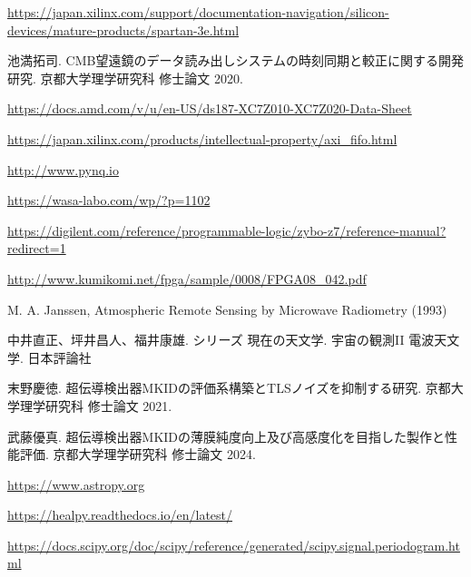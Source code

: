 \begin{thebibliography}{99}
\href{https://japan.xilinx.com/support/documentation-navigation/silicon-devices/mature-products/spartan-3e.html}{
https://japan.xilinx.com/support/documentation-navigation/silicon-devices/mature-products/spartan-3e.html}

池満拓司. CMB望遠鏡のデータ読み出しシステムの時刻同期と較正に関する開発研究. 京都大学理学研究科 修士論文 2020.

\href{https://docs.amd.com/v/u/en-US/ds187-XC7Z010-XC7Z020-Data-Sheet}{https://docs.amd.com/v/u/en-US/ds187-XC7Z010-XC7Z020-Data-Sheet}

\href{https://japan.xilinx.com/products/intellectual-property/axi\_fifo.html}{https://japan.xilinx.com/products/intellectual-property/axi\_fifo.html}

\href{http://www.pynq.io}{http://www.pynq.io}

\href{https://wasa-labo.com/wp/?p=1102}{https://wasa-labo.com/wp/?p=1102}

\href{https://digilent.com/reference/programmable-logic/zybo-z7/reference-manual?redirect=1}{https://digilent.com/reference/programmable-logic/zybo-z7/reference-manual?redirect=1}


\href{http://www.kumikomi.net/fpga/sample/0008/FPGA08\_042.pdf}{http://www.kumikomi.net/fpga/sample/0008/FPGA08\_042.pdf}


M. A. Janssen, Atmospheric Remote Sensing by Microwave Radiometry (1993)

中井直正、坪井昌人、福井康雄. シリーズ  現在の天文学. 宇宙の観測I\hspace{-1.2pt}I  電波天文学. 日本評論社

末野慶徳. 超伝導検出器MKIDの評価系構築とTLSノイズを抑制する研究. 京都大学理学研究科 修士論文 2021.

武藤優真. 超伝導検出器MKIDの薄膜純度向上及び高感度化を目指した製作と性能評価. 京都大学理学研究科 修士論文 2024.

\href{https://www.astropy.org}{https://www.astropy.org}

\href{https://healpy.readthedocs.io/en/latest/}{https://healpy.readthedocs.io/en/latest/}

\href{https://docs.scipy.org/doc/scipy/reference/generated/scipy.signal.periodogram.html}{https://docs.scipy.org/doc/scipy/reference/generated/scipy.signal.periodogram.html}


\end{thebibliography}
